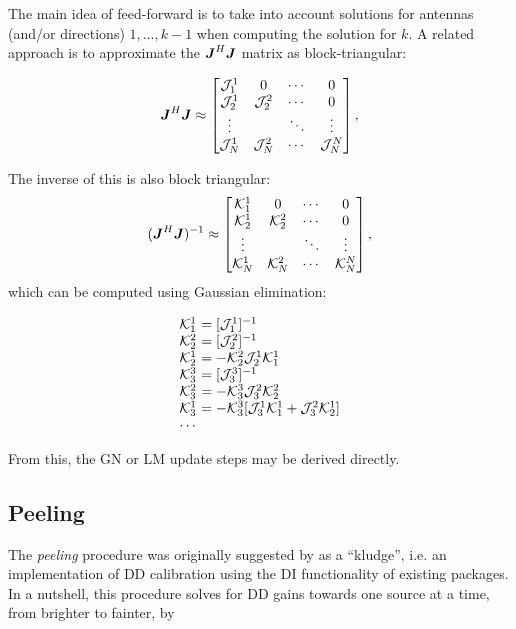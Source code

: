 \documentclass[useAMS,usenatbib]{mn2e}
\newcommand{\mat}[1]{{\bmath{#1}}}
\newcommand{\JJ}{\mat{J}} %
\newcommand{\JHJ}{\JJ^H\JJ} %
\begin{document}
The main idea of feed-forward is to take into account solutions for antennas (and/or directions) $1,...,k-1$ when computing the
solution for $k$. A related approach is to approximate the $\JHJ$ matrix as block-triangular:

\begin{equation}
\label{eq:JHJ:DD:block-triag}
\JHJ \approx \Matrix{cccc}{
\JJJ^1_1 & 0 & \cdots & 0 \\
\JJJ^1_2 & \JJJ^2_2 & \cdots & 0 \\
\vdots & & \ddots &  \vdots \\
\JJJ_{N}^1 & \JJJ_{N}^2 & \cdots & \JJJ_{N}^{N} },
\end{equation}

\newcommand{\KKK}{\mathcal{K}}

The inverse of this is also block triangular:
\begin{equation}
\label{eq:JHJ:DD:block-triag-inv}
(\JHJ)^{-1} \approx \Matrix{cccc}{
\KKK^1_1 & 0 & \cdots & 0 \\
\KKK^1_2 & \KKK^2_2 & \cdots & 0 \\
\vdots & & \ddots &  \vdots \\
\KKK_{N}^1 & \KKK_{N}^2 & \cdots & \KKK_{N}^{N} },
\end{equation}
which can be computed using Gaussian elimination:

\[
\begin{array}{l@{~}l}
\KKK^1_1 &= [\JJJ^1_1]^{-1} \\
\KKK^2_2 &= [\JJJ^2_2]^{-1} \\
\KKK^1_2 &= - \KKK^2_2 \JJJ^1_2 \KKK^1_1\\
\KKK^3_3 &= [\JJJ^3_3]^{-1} \\
\KKK^2_3 &= - \KKK^3_3 \JJJ^2_3 \KKK^2_2\\
\KKK^1_3 &= - \KKK^3_3 [ \JJJ^1_3 \KKK^1_1 + \JJJ^2_3 \KKK^1_2  ]\\
\cdots
\end{array}
\]

From this, the GN or LM update steps may be derived directly.

\subsection{Peeling}
\label{sec:peeling}

The \emph{peeling} procedure was originally suggested by \citet{JEN:peeling} as a ``kludge'', i.e. an implementation of DD calibration 
using the DI functionality of existing packages. In a nutshell, this procedure solves for DD gains towards one source at a time, from
brighter to fainter, by
\end{document}
